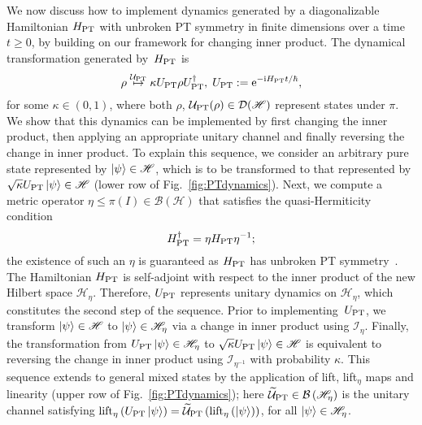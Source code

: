\documentclass[amsmath,amssymb,aps,pra,superscriptaddress,twocolumn]{revtex4-2}
\begin{document}
We now discuss how to implement dynamics generated by 
a diagonalizable Hamiltonian $H_{\rm PT}$ with unbroken PT symmetry in finite dimensions
over a time $t \ge 0$,
by building on our framework for changing inner product.
The dynamical transformation generated by~$H_{\rm PT}$ is
\begin{equation}
\label{eq:UPT}
    \rho \stackrel{\mathcal{U}_{\rm PT}}{\mapsto} \kappa U_{\rm{PT}}\rho U^\dagger_{\rm{PT}}, \; U_{\rm{PT}} := \text{e}^{-\text{i}H_{\rm {PT}}t/\hbar},
\end{equation}
for some $\kappa\in(0,1)$, where both $\rho$, $\mathcal{U}_{\rm PT}(\rho)\in\mathcal{D}(\mathscr{H})$ represent states under $\pi$.
We show that this dynamics can be implemented by first changing the inner product, 
then applying an appropriate unitary channel and finally reversing the change in inner product.
To explain this sequence, we consider an arbitrary pure state represented by $\ket{\psi}\in \mathscr{H}$,
which is to be transformed to that represented by $\sqrt{\kappa}U_{\rm PT}\ket{\psi}\in \mathscr{H}$ 
(lower row of Fig.~\ref{fig:PTdynamics}).
Next, we compute a metric operator $\eta\leq \pi(I)\in \mathcal{B}(\mathscr H)$
that satisfies the quasi-Hermiticity condition
\begin{equation}\label{eq:quasiHermitian}
H^\dagger_{\rm {PT}} = \eta H_{\rm {PT}} \eta^{-1};
\end{equation}
the existence of such an $\eta$ is guaranteed 
as $H_{\rm PT}$ has unbroken PT symmetry~\cite{Mos02}.
The Hamiltonian $H_{\rm PT}$ is self-adjoint with respect to the inner product of the new Hilbert space $\mathscr{H}_{\eta}$.
Therefore, $U_{\rm PT}$ represents unitary dynamics on $\mathscr{H}_{\eta}$,
which constitutes the second step of the sequence.
Prior to implementing~$U_{\rm PT}$, we transform $\ket{\psi}\in\mathscr{H}$ to $\ket{\psi}\in\mathscr{H}_{\eta}$ 
via a change in inner product using $\mathcal{I}_\eta$.
Finally, the transformation from $U_{\rm PT}\ket{\psi}\in\mathscr{H}_{\eta}$ to $\sqrt{\kappa}U_{\rm PT}\ket{\psi}\in\mathscr{H}$
is equivalent to reversing the change in inner product using  $\mathcal{I}_{\eta^{-1}}$ with probability $\kappa$. 
This sequence extends to general mixed states by the application of lift, lift${}_\eta$ maps 
and linearity (upper row of Fig.~\ref{fig:PTdynamics});
here  $ \widetilde{\mathcal{U}}_{\rm{PT}}\in\mathcal{B}\left(\mathscr{H}_\eta\right)$ 
is the unitary channel satisfying
$\operatorname{lift}_\eta\left(U_{\rm PT}\ket{\psi}\right) =  \widetilde{\mathcal{U}}_{\rm{PT}}\left(\operatorname{lift}_\eta\left(\ket{\psi}\right)\right)$,
for all $\ket{\psi}\in\mathscr{H}_\eta$.
\end{document}
